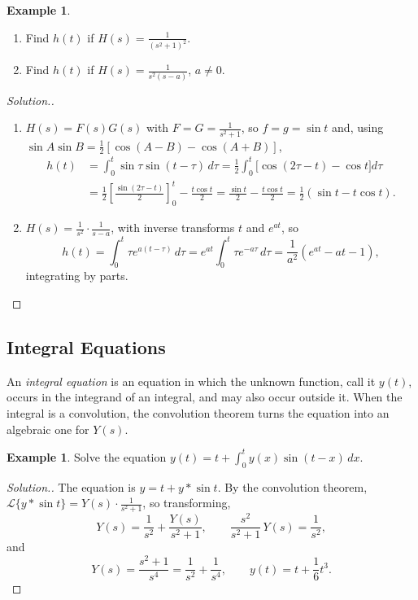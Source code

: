 \documentclass[11pt,a4paper]{article}
\theoremstyle{definition}
\newtheorem{exa}[thm]{Example}
\newenvironment{solution}
  {\renewcommand{\qedsymbol}{}\begin{proof}[\textit{Solution}.]}
  {\end{proof}}
\begin{document}
\begin{exa}
\label{ex:convolutioninverse}
\begin{enumerate}
\item Find $h(t)$ if $H(s) = \frac{1}{(s^2+1)^2}$.
\item Find $h(t)$ if $H(s) = \frac{1}{s^2 (s-a)}$, $a\neq 0$.
\end{enumerate}
\end{exa}

\begin{solution}
\begin{enumerate}
\item $H(s) = F(s)G(s)$ with $F = G = \frac{1}{s^2 + 1}$, so $f = g = \sin t$
and, using $\sin A\sin B = \frac12[\cos(A - B) - \cos(A + B)]$,
\begin{align*}
h(t) & = \int^t_0\sin \tau \sin (t-\tau)\, d\tau = \frac{1}{2}\int^t_0
\big[\cos (2\tau - t) - \cos t\big]d\tau\\
& = \frac12\left[\frac{\sin(2\tau - t)}{2}\right]_0^t - \frac{t\cos t}{2} =
\frac{\sin t}{2} - \frac{t\cos t}{2} = \frac{1}{2}(\sin t - t\cos t) .
\end{align*}

\item $H(s) = \frac{1}{s^2}\cdot \frac{1}{s-a}$, with inverse transforms $t$ and
$e^{at}$, so
\[h(t) = \int^t_0 \tau e^{a(t-\tau)}\, d\tau = e^{at} \int^t_0\tau
e^{-a\tau}\,d \tau = \frac{1}{a^2}\left(e^{at} -at -1\right),\]
integrating by parts.
\end{enumerate}
\end{solution}

{\color[wave]{485}\subsection{Integral Equations}}

An \emph{integral equation} is an equation in which the unknown function, call
it $y(t)$, occurs in the integrand of an integral, and may also occur outside
it. When the integral is a convolution, the convolution theorem turns the
equation into an algebraic one for $Y(s)$.

\begin{exa}
\label{ex:integraleq}
Solve the equation $y(t) = t + \int^t_0 y(x)\sin (t -x)\,dx$.
\end{exa}

\begin{solution}
The equation is $y = t + y*\sin t$. By the convolution theorem,
$\mathcal{L}\{y*\sin t\} = Y(s)\cdot \frac{1}{s^2 + 1}$, so transforming,
\[Y(s) =\frac{1}{s^2} + \frac{Y(s)}{s^2 + 1},\qquad \frac{s^2}{s^2 + 1}\,Y(s) =
\frac{1}{s^2} ,\]
and
\[Y(s) = \frac{s^2 + 1}{s^4} = \frac{1}{s^2} + \frac{1}{s^4},\qquad y(t) = t +
\frac{1}{6}t^3 .\]
\end{solution}
\end{document}
